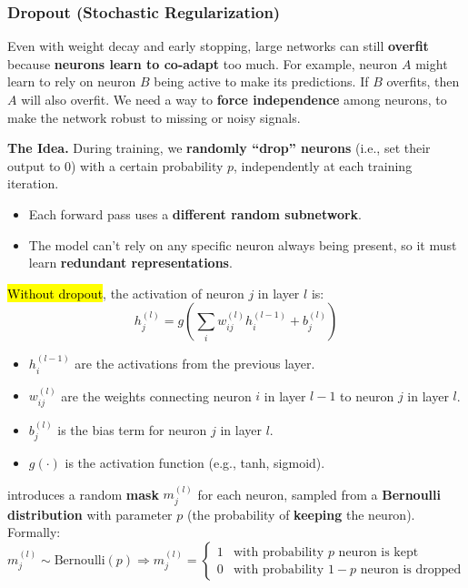 \subsubsection{Dropout (Stochastic Regularization)}\label{sec:nn-dropout-stochastic-regularization}

Even with weight decay and early stopping, large networks can still \textbf{overfit} because \textbf{neurons learn to co-adapt} too much. For example, neuron $A$ might learn to rely on neuron $B$ being active to make its predictions. If $B$ overfits, then $A$ will also overfit. We need a way to \textbf{force independence} among neurons, to make the network robust to missing or noisy signals.

\highspace
\textcolor{Green3}{ \textbf{The Idea.}} During training, we \textbf{randomly ``drop'' neurons} (i.e., set their output to 0) with a certain probability $p$, independently at each training iteration.
\begin{itemize}
    \item Each forward pass uses a \textbf{different random subnetwork}.
    \item The model can't rely on any specific neuron always being present, so it must learn \textbf{redundant representations}.
\end{itemize}
\hl{Without dropout}, the activation of neuron $j$ in layer $l$ is:
\begin{equation*}
    h_j^{(l)} = g\left( \sum_{i} w_{ij}^{(l)} h_i^{(l-1)} + b_j^{(l)} \right)
\end{equation*}
\begin{itemize}
    \item $h_{i}^{(l-1)}$ are the activations from the previous layer.
    \item $w_{ij}^{(l)}$ are the weights connecting neuron $i$ in layer $l-1$ to neuron $j$ in layer $l$.
    \item $b_j^{(l)}$ is the bias term for neuron $j$ in layer $l$.
    \item $g(\cdot)$ is the activation function (e.g., tanh, sigmoid).
\end{itemize}
 introduces a random \textbf{mask} $m_j^{(l)}$ for each neuron, sampled from a \textbf{Bernoulli distribution} with parameter $p$ (the probability of \textbf{keeping} the neuron). Formally:
\begin{equation}
    m_j^{(l)} \sim \text{Bernoulli}(p) \Rightarrow m_j^{(l)} = \begin{cases}
        1 & \text{with probability } p \text{ neuron is kept} \\
        0 & \text{with probability } 1-p \text{ neuron is dropped}
    \end{cases}
\end{equation}

